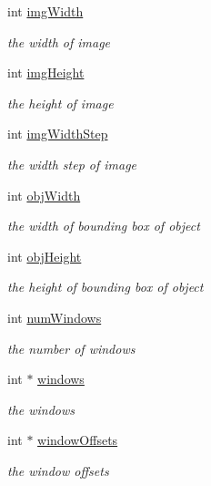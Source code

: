 \begin{DoxyCompactItemize}
int \hyperlink{classtld_1_1DetectorCascade_a593db7c6ab225f17ac02cd9ef5faebd2}{img\-Width}
\begin{DoxyCompactList}\small\item\em the width of image \end{DoxyCompactList}\item 
int \hyperlink{classtld_1_1DetectorCascade_a4e9b954d0b95f6e91d479bba9ec6beac}{img\-Height}
\begin{DoxyCompactList}\small\item\em the height of image \end{DoxyCompactList}\item 
int \hyperlink{classtld_1_1DetectorCascade_aa47c6463f1ae23868551a4c82c555f24}{img\-Width\-Step}
\begin{DoxyCompactList}\small\item\em the width step of image \end{DoxyCompactList}\item 
int \hyperlink{classtld_1_1DetectorCascade_a1c7a7fddb085fca4577779110637c5c8}{obj\-Width}
\begin{DoxyCompactList}\small\item\em the width of bounding box of object \end{DoxyCompactList}\item 
int \hyperlink{classtld_1_1DetectorCascade_a1186ed695cf6e9f00d180ec92e4aa1ea}{obj\-Height}
\begin{DoxyCompactList}\small\item\em the height of bounding box of object \end{DoxyCompactList}\item 
int \hyperlink{classtld_1_1DetectorCascade_a700932efdadfdd218697b56aa7703b4b}{num\-Windows}
\begin{DoxyCompactList}\small\item\em the number of windows \end{DoxyCompactList}\item 
int $\ast$ \hyperlink{classtld_1_1DetectorCascade_a0acc3bf212228a7b3d47b2d795f1a5a4}{windows}
\begin{DoxyCompactList}\small\item\em the windows \end{DoxyCompactList}\item 
int $\ast$ \hyperlink{classtld_1_1DetectorCascade_a259b095591f3d09904277ff844d94b0b}{window\-Offsets}
\begin{DoxyCompactList}\small\item\em the window offsets \end{DoxyCompactList}\item 

\end{DoxyCompactItemize}
